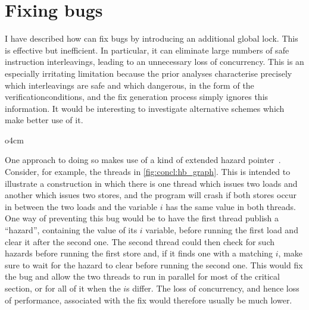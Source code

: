 \section{Fixing bugs}

I have described how {\technique} can fix bugs by introducing an
additional global lock.  This is effective but inefficient.  In
particular, it can eliminate large numbers of safe instruction
interleavings, leading to an unnecessary loss of concurrency.  This is
an especially irritating limitation because the prior analyses
characterise precisely which interleavings are safe and which
dangerous, in the form of the \glspl{verificationcondition}, and the
fix generation process simply ignores this information.  It would be
interesting to investigate alternative schemes which make better use
of it.

\begin{wrapfigure}{o}{4cm}
  \vspace{-12pt}
  \vspace{-12pt}
\end{wrapfigure}
One approach to doing so makes use of a kind of extended hazard
pointer~\cite{Michael2004}.  Consider, for example, the threads in
\autoref{fig:concl:hb_graph}.  This is intended to illustrate a
construction in which there is one thread which issues two loads and
another which issues two stores, and the program will crash if both
stores occur in between the two loads and the variable $i$ has the
same value in both threads.  One way of preventing this bug would be
to have the first thread publish a ``hazard'', containing the value of
its $i$ variable, before running the first load and clear it after the
second one.  The second thread could then check for such hazards
before running the first store and, if it finds one with a matching
$i$, make sure to wait for the hazard to clear before running the
second one.  This would fix the bug and allow the two threads to run
in parallel for most of the critical section, or for all of it when
the $i$s differ.  The loss of concurrency, and hence loss of
performance, associated with the fix would therefore usually be much
lower.

